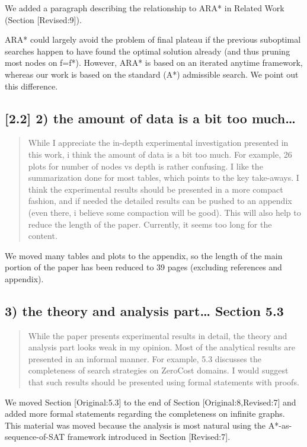 \documentclass{article}
\begin{document}
We added a paragraph describing the relationship to ARA* in Related Work (Section [Revised:9]).

ARA* could largely avoid the problem of final plateau if the previous suboptimal searches happen to
have found the optimal solution already (and thus pruning most nodes on f=f*). 
However, ARA* is based on an iterated anytime framework, whereas our work is based on the standard (A*) admissible search.
We point out this difference.


\subsection{[2.2] 2) the amount of data is a bit too much\ldots{}}
\label{sec:orgheadline15}

\begin{quote}
 While I appreciate the in-depth experimental investigation
presented in this work, i think the amount of data is a bit too much.
For example, 26 plots for number of nodes vs depth is rather
confusing. I like the summarization done for most tables, which points
to the key take-aways. I think the experimental results should be
presented in a more compact fashion, and if needed the detailed
results can be pushed to an appendix (even there, i believe some
compaction will be good). This will also help to reduce the length of
the paper. Currently, it seems too long for the content.
\end{quote}

We moved many tables and plots to the appendix, so the length of the main portion of the paper has been reduced to 39 pages (excluding references and appendix).

\subsection{\label{orgtarget1} 3) the theory and analysis part\ldots{} Section 5.3}
\label{sec:orgheadline16}

\begin{quote}
 While the paper presents experimental results in detail, the theory
and analysis part looks weak in my opinion. Most of the analytical
results are presented in an informal manner. For example, 5.3
discusses the completeness of search strategies on ZeroCost domains. I
would suggest that such results should be presented using formal
statements with proofs.
\end{quote}

We moved Section [Original:5.3]
to the end of Section [Original:8,Revised:7] and added more formal statements regarding the completeness 
on infinite graphs. This material was moved because the analysis is most natural 
using the A*-as-sequence-of-SAT framework introduced in Section [Revised:7].
\end{document}
